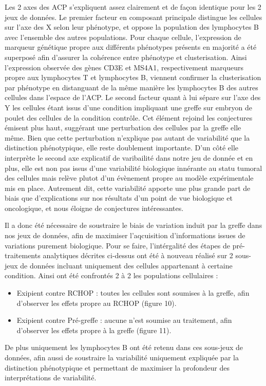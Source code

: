 \documentclass[12pt]{report}
\begin{document}
Les 2 axes des ACP s'expliquent assez clairement et de façon identique pour les 2 jeux de données. 
Le premier facteur en composant principale distingue les cellules sur l'axe des X selon leur phénotype, et oppose la population des lymphocytes B avec l'ensemble des autres populations.
Pour chaque cellule, l'expression de marqueur génétique propre aux différents phénotypes présents en majorité a été superposé afin d'assurer la cohérence entre phénotype et clusterisation.
Ainsi l'expression observée des gènes CD3E et MS4A1, respectivement marqueurs propre aux lymphocytes T et lymphocytes B, viennent confirmer la clusterisation par phénotype 
en distanguant de la même manière les lymphocytes B des autres cellules dans l'espace de l'ACP.
Le second facteur quant à lui sépare sur l'axe des Y les cellules étant issus d'une condition impliquant une greffe sur embryon de poulet des cellules de la condition contrôle.
Cet élément rejoind les conjectures émisent plus haut, suggérant une perturbation des cellules par la greffe elle même. 
Bien que cette perturbation n'explique pas autant de variabilité que la distinction phénotypique, elle reste doublement importante. D'un côté elle interprète le second axe 
explicatif de varibailité dans notre jeu de donnée et en plus, elle est non pas issus d'une variabilité biologique innérante au statu tumoral des cellules
mais relève plutot d'un évènement propre au modèle expérimentale mis en place. 
Autrement dit, cette variabilité apporte une plus grande part de biais que d'explications sur nos résultats d'un point de vue biologique et oncologique, et nous éloigne de conjectures intéressantes.

Il a donc été nécessaire de soustraire le biais de variation induit par la greffe dans nos jeux de données, afin de maximiser l'aqcuisition d'informations issues de variations purement biologique.
Pour se faire, l'intérgalité des étapes de pré-traitements analytiques décrites ci-dessus ont été à nouveau réalisé sur 2 sous-jeux de données incluant uniquement des cellules appartenant à certaine condition. 
Ainsi ont été confrontés 2 à 2 les populations cellulaires :
\begin{itemize}
\item Exipient contre RCHOP : toutes les cellules sont soumises à la greffe, afin d'observer les effets propre au RCHOP (figure 10).
\item Exipient contre Pré-greffe : aucune n'est soumise au traitement, afin d'observer les effets propre à la greffe (figure 11).
\end{itemize} 
De plus uniquement les lymphocytes B ont été retenu dans ces sous-jeux de données, afin aussi de soustraire la variabilité uniquement expliquée par la distinction phénotypique
et permettant de maximiser la profondeur des interprétations de variabilité.
\end{document}
